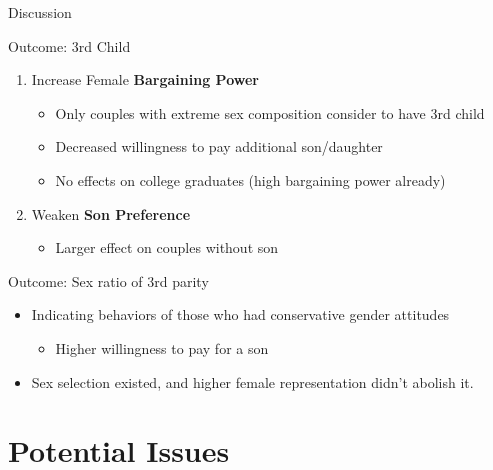 \documentclass[
  10pt,
  ignorenonframetext,
  aspectratio=43,
]{beamer}
\providecommand{\tightlist}{%
  \setlength{\itemsep}{0pt}\setlength{\parskip}{0pt}}
\begin{document}
\begin{frame}{Discussion}
\protect\hypertarget{discussion}{}
\begin{block}{Outcome: 3rd Child}
\protect\hypertarget{outcome-3rd-child}{}
\begin{enumerate}
\tightlist
\item
  Increase Female \textbf{Bargaining Power}

  \begin{itemize}
  \tightlist
  \item
    Only couples with extreme sex composition consider to have 3rd child
  \item
    Decreased willingness to pay additional son/daughter
  \item
    No effects on college graduates (high bargaining power already)
  \end{itemize}
\item
  Weaken \textbf{Son Preference}

  \begin{itemize}
  \tightlist
  \item
    Larger effect on couples without son
  \end{itemize}
\end{enumerate}
\end{block}

\begin{block}{Outcome: Sex ratio of 3rd parity}
\protect\hypertarget{outcome-sex-ratio-of-3rd-parity}{}
\begin{itemize}
\tightlist
\item
  Indicating behaviors of those who had conservative gender attitudes

  \begin{itemize}
  \tightlist
  \item
    Higher willingness to pay for a son
  \end{itemize}
\item
  Sex selection existed, and higher female representation didn't abolish
  it.
\end{itemize}
\end{block}
\end{frame}

\hypertarget{potential-issues}{%
\section{Potential Issues}\label{potential-issues}}
\end{document}
